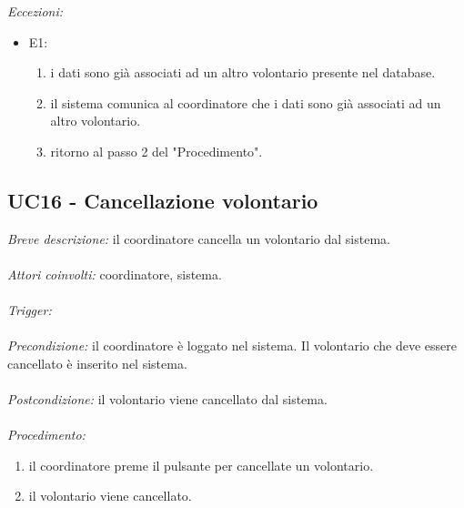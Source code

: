 \textit{Eccezioni:}
\begin{itemize}
	\item E1:
	\begin{enumerate}
		\item i dati sono già associati ad un altro volontario presente nel database.
		\item il sistema comunica al coordinatore che i dati sono già associati ad un altro volontario.
		\item ritorno al passo 2 del "Procedimento".
	\end{enumerate}
\end{itemize}

\subsection{UC16 - Cancellazione volontario}
\textit{Breve descrizione:} il coordinatore cancella un volontario dal sistema. 
\\
\\
\textit{Attori coinvolti:} coordinatore, sistema.
\\
\\
\textit{Trigger:}
\\
\\
\textit{Precondizione:} il coordinatore è loggato nel sistema.
Il volontario che deve essere cancellato è inserito nel sistema.
\\
\\
\textit{Postcondizione:} il volontario viene cancellato dal sistema.
\\
\\
\textit{Procedimento:}
\begin{enumerate}
	\item il coordinatore preme il pulsante per cancellate un volontario.
	\item il volontario viene cancellato.
\end{enumerate}

